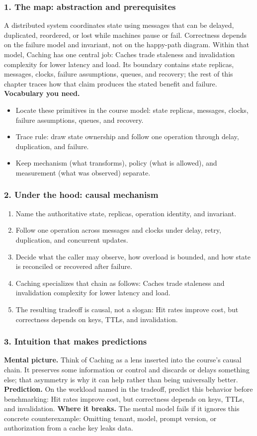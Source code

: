 \subsubsection*{1. The map: abstraction and prerequisites}
A distributed system coordinates state using messages that can be delayed, duplicated, reordered, or lost while machines pause or fail. Correctness depends on the failure model and invariant, not on the happy-path diagram.
Within that model, Caching has one central job: Caches trade staleness and invalidation complexity for lower latency and load. Its boundary contains state replicas, messages, clocks, failure assumptions, queues, and recovery; the rest of this chapter traces how that claim produces the stated benefit and failure.
\textbf{Vocabulary you need.}\begin{itemize}
\item Locate these primitives in the course model: state replicas, messages, clocks, failure assumptions, queues, and recovery.
\item Trace rule: draw state ownership and follow one operation through delay, duplication, and failure.
\item Keep mechanism (what transforms), policy (what is allowed), and measurement (what was observed) separate.
\end{itemize}
\subsubsection*{2. Under the hood: causal mechanism}\begin{enumerate}
\item Name the authoritative state, replicas, operation identity, and invariant.
\item Follow one operation across messages and clocks under delay, retry, duplication, and concurrent updates.
\item Decide what the caller may observe, how overload is bounded, and how state is reconciled or recovered after failure.
\item Caching specializes that chain as follows: Caches trade staleness and invalidation complexity for lower latency and load.
\item The resulting tradeoff is causal, not a slogan: Hit rates improve cost, but correctness depends on keys, TTLs, and invalidation.
\end{enumerate}
\subsubsection*{3. Intuition that makes predictions}
\textbf{Mental picture.} Think of Caching as a lens inserted into the course's causal chain. It preserves some information or control and discards or delays something else; that asymmetry is why it can help rather than being universally better.
\textbf{Prediction.} On the workload named in the tradeoff, predict this behavior before benchmarking: Hit rates improve cost, but correctness depends on keys, TTLs, and invalidation.
\textbf{Where it breaks.} The mental model fails if it ignores this concrete counterexample: Omitting tenant, model, prompt version, or authorization from a cache key leaks data.
